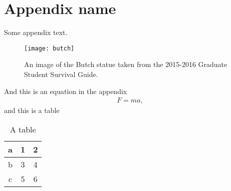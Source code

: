 \section{Appendix name}

Some appendix text.
\begin{figure}[H] %
    \centering
    \texttt{[image: butch]}
    \caption{An image of the Butch statue taken from the 2015-2016 Graduate Student Survival Guide.}
    \label{fig:a1}
\end{figure}
And this is an equation in the appendix
\begin{align}
    F=ma,
\end{align}  
and this is a table
\begin{table}[H]
\centering
\begin{tabular}{|c||c|c|}
  \hline
  a  & 1 & 2 \\\hline
  b  & 3 & 4 \\
  c  & 5 & 6 \\
  \hline
\end{tabular}
\caption{A table}
\end{table}